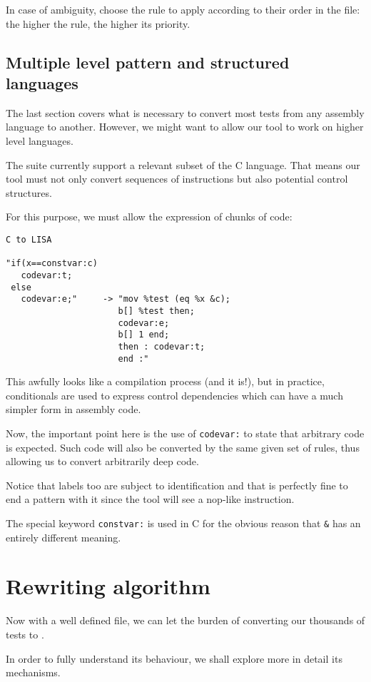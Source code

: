 In case of ambiguity, \jingle{} choose the rule to apply according to their order
in the file: the higher the rule, the higher its priority.

\subsection{Multiple level pattern and structured languages}
The last section covers what is necessary to convert most tests from any assembly language
to another. However, we might want to allow our tool to work on higher level languages.

The suite currently support a relevant subset of the C language.
That means our tool must not only convert sequences of instructions but also
potential control structures.

For this purpose, we must allow the expression of chunks of code:

\begin{verbatim}
C to LISA

"if(x==constvar:c)
   codevar:t;
 else
   codevar:e;"     -> "mov %test (eq %x &c);
                      b[] %test then;
                      codevar:e;
                      b[] 1 end;
                      then : codevar:t;
                      end :"
\end{verbatim}

This awfully looks like a compilation process (and it is!), but in practice,
conditionals are used to express control dependencies which can have a much
simpler form in assembly code.

Now, the important point here is the use of \verb+codevar:+ to state that
arbitrary code is expected. Such code will also be converted by the same
given set of rules, thus allowing us to convert arbitrarily deep code.

Notice that labels too are subject to identification and that is
perfectly fine to end a pattern with it since the tool will see
a nop-like instruction.

The special keyword \verb+constvar:+ is used in C for the obvious reason
that \verb+&+ has an entirely different meaning.

\section{Rewriting algorithm}
Now with a well defined file, we can let the burden of converting our
thousands of tests to \jingle{}.

In order to fully understand its behaviour, we shall explore
more in detail its mechanisms.

